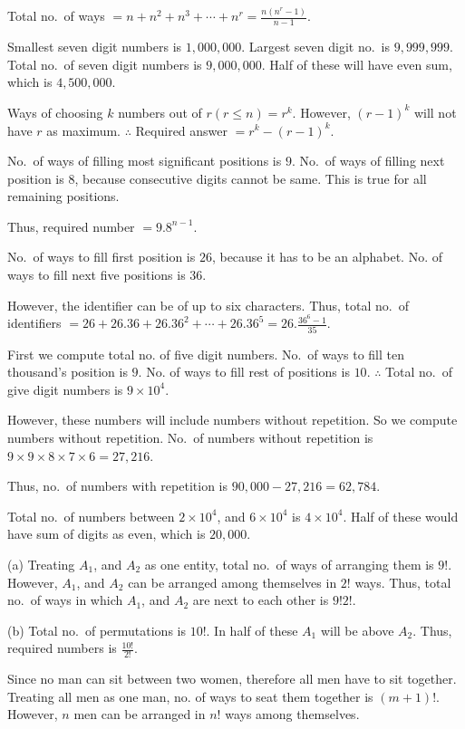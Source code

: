   Total no.\ of ways $= n + n^2 + n^3 + \cdots + n^r = \frac{n(n^r - 1)}{n - 1}$.
\item Smallest seven digit numbers is $1,000,000$. Largest seven digit no.\ is $9,999,999$. Total no.\ of
  seven digit numbers is $9,000,000$. Half of these will have even sum, which is $4,500,000$.
\item Ways of choosing $k$ numbers out of $r(r\leq n) = r^k$. However, $(r - 1)^k$ will not have $r$ as
  maximum. $\therefore$ Required answer $= r^k - (r - 1)^k$.
\item No.\ of ways of filling most significant positions is $9$. No.\ of ways of filling next position is
  $8$, because consecutive digits cannot be same. This is true for all remaining positions.

  Thus, required number $= 9.8^{n - 1}$.
\item No.\ of ways to fill first position is $26$, because it has to be an alphabet. No. of ways to fill
  next five positions is $36$.

  However, the identifier can be of up to six characters. Thus, total no.\ of identifiers $= 26 + 26.36 +
  26.36^2 + \cdots + 26.36^5 = 26.\frac{36^6 - 1}{35}$.
\item First we compute total no. of five digit numbers. No.\ of ways to fill ten thousand's position is
  $9$. No. of ways to fill rest of positions is $10$. $\therefore$ Total no.\ of give digit numbers is
  $9\times10^4$.

  However, these numbers will include numbers without repetition. So we compute numbers without
  repetition. No.\ of numbers without repetition is $9\times9\times8\times7\times6 = 27,216$.

  Thus, no.\ of numbers with repetition is $90,000 - 27,216 = 62,784$.
\item Total no.\ of numbers between $2\times10^4$, and $6\times10^4$ is $4\times10^4$. Half of these would
  have sum of digits as even, which is $20,000$.
\item (a) Treating $A_1$, and $A_2$ as one entity, total no.\ of ways of arranging them is $9!$. However,
  $A_1$, and $A_2$ can be arranged among themselves in $2!$ ways. Thus, total no.\ of ways in which $A_1$,
  and $A_2$ are next to each other is $9!2!$.

  (b) Total no.\ of permutations is $10!$. In half of these $A_1$ will be above $A_2$. Thus, required
  numbers is $\frac{10!}{2!}$.
\item Since no man can sit between two women, therefore all men have to sit together. Treating all men as
  one man, no. of ways to seat them together is $(m + 1)!$. However, $n$ men can be arranged in $n!$ ways
  among themselves.

